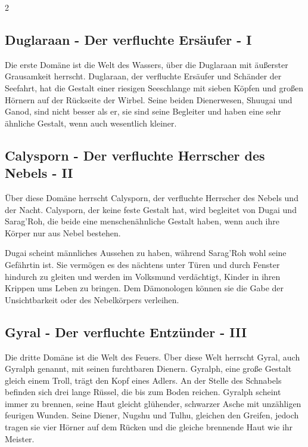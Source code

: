 \begin{multicols}{2}
{\subsection{Duglaraan - Der verfluchte Ersäufer - I}\label{subsec:duglaraan-der-verfluchte-ersaufer}

Die erste Domäne ist die Welt des Wassers, über die Duglaraan mit äußerster Grausamkeit herrscht.
Duglaraan, der verfluchte Ersäufer und Schänder der Seefahrt, hat die Gestalt einer riesigen Seeschlange mit sieben Köpfen und großen Hörnern auf der Rückseite der Wirbel.
Seine beiden Dienerwesen, Shuugai und Ganod, sind nicht besser als er, sie sind seine Begleiter und haben eine sehr ähnliche Gestalt, wenn auch wesentlich kleiner.

\subsection{Calysporn - Der verfluchte Herrscher des Nebels - II}\label{subsec:calysporn-der-verfluchte-herrscher-des-nebels}

Über diese Domäne herrscht Calysporn, der verfluchte Herrscher des Nebels und der Nacht.
Calysporn, der keine feste Gestalt hat, wird begleitet von Dugai und Sarag'Roh, die beide eine menschenähnliche Gestalt haben, wenn auch ihre Körper nur aus Nebel bestehen.

Dugai scheint männliches Aussehen zu haben, während Sarag'Roh wohl seine Gefährtin ist.
Sie vermögen es des nächtens unter Türen und durch Fenster hindurch zu gleiten und werden im Volksmund verdächtigt, Kinder in ihren Krippen ums Leben zu bringen.
Dem Dämonologen können sie die Gabe der Unsichtbarkeit oder des Nebelkörpers verleihen.

\subsection{Gyral - Der verfluchte Entzünder - III}\label{subsec:gyral-der-verfluchte-entzunder}

Die dritte Domäne ist die Welt des Feuers.
Über diese Welt herrscht Gyral, auch Gyralph genannt, mit seinen furchtbaren Dienern.
Gyralph, eine große Gestalt gleich einem Troll, trägt den Kopf eines Adlers.
An der Stelle des Schnabels befinden sich drei lange Rüssel, die bis zum Boden reichen.
Gyralph scheint immer zu brennen, seine Haut gleicht glühender, schwarzer Asche mit unzähligen feurigen Wunden.
Seine Diener, Nugshu und Tulhu, gleichen den Greifen, jedoch tragen sie vier Hörner auf dem Rücken und die gleiche brennende Haut wie ihr Meister.

}
\end{multicols}
